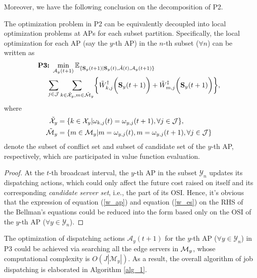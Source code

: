 Moreover, we have the following conclusion on the decomposition of P2.
\begin{lemma}[]
    The optimization problem in P2 can be equivalently decoupled into local optimization problems at APs {for each subset partition}.
    Specifically, {the local optimization for each AP (say the $y$-th AP) in the $n$-th subset ($\forall n$) can be written as}
    \small{
    \begin{align}
        &\textbf{P3:}~
        \min_{ {\mathcal{A}}_{y}(t+1) }
        \mathbb{E}_{\set{ \Stat_{y}(t+1)|\Stat_{y}(t), \hat{\mathcal{A}}(t), {\mathcal{A}}_{y}(t+1) }}
        \nonumber\\
        &~~~~\sum_{j\in\jSpace} \sum_{ k\in\tilde{\ccSet}_{y},m\in\tilde{\esSet}_{y} }
        \Brace{
            \tilde{W}^{\AP}_{k,j}\Paren{\Stat_{y}(t+1)}
            +\tilde{W}^{\ES}_{m,j}\Paren{\Stat_{y}(t+1)}
        },
        \label{eqn:partial}
    \end{align}
    }%
    where
    {\small
    \begin{align*}
       \tilde{\mathcal{X}}_{y} &= \{k\in\mathcal{X}_{y} | \omega_{k,j}(t)=\omega_{y,j}(t+1), \forall j\in\mathcal{J}\}, \\
       \tilde{\mathcal{M}}_{y} &= \{m\in\mathcal{M}_{y} | m=\omega_{y,j}(t), m=\omega_{y,j}(t+1), \forall j\in\mathcal{J}\}
    \end{align*}
    }%
    denote the {subset of conflict set} and {subset of candidate set} of the $y$-th AP, respectively, which are participated in value function evaluation.
    \label{lemma:w_partial}
\end{lemma}
\begin{proof}
    At the $t$-th broadcast interval, the $y$-th AP in the subset $\mathcal{Y}_{n}$ updates its dispatching actions, which could only affect the future cost raised on itself and its corresponding \emph{candidate server set}, i.e., the part of its OSI.
    Hence, it's obvious that the expression of equation (\ref{w_ap}) and equation (\ref{w_es}) on the RHS of the Bellman's equations could be reduced into the form based only on the OSI of the $y$-th AP ($\forall y\in\mathcal{Y}_{n}$).
\end{proof}
The optimization of dispatching actions $\mathcal{A}_{y}(t+1)$ for the $y$-th AP ($\forall y\in\mathcal{Y}_{n}$) in P3 could be achieved via searching all the edge servers in $\mathcal{M}_{y}$, whose computational complexity is $O(J|\mathcal{M}_{y}|)$.
As a result, the overall algorithm of job dispatching is elaborated in Algorithm \ref{alg_1}.

